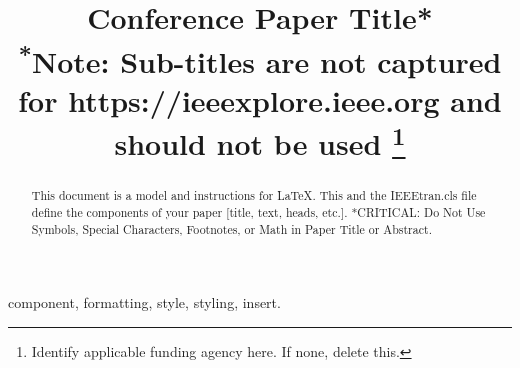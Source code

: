 \documentclass[conference]{IEEEtran}
\begin{document}
\title{Conference Paper Title*\\
{\footnotesize \textsuperscript{*}Note: Sub-titles are not captured for https://ieeexplore.ieee.org  and
should not be used}
\thanks{Identify applicable funding agency here. If none, delete this.}
}

\author{
    \and
    \and
}

\maketitle


\begin{abstract}
This document is a model and instructions for \LaTeX.
This and the IEEEtran.cls file define the components of your paper [title, text, heads, etc.]. *CRITICAL: Do Not Use Symbols, Special Characters, Footnotes, 
or Math in Paper Title or Abstract.
\end{abstract}


\begin{IEEEkeywords}
component, formatting, style, styling, insert.
\end{IEEEkeywords}

\end{document}
